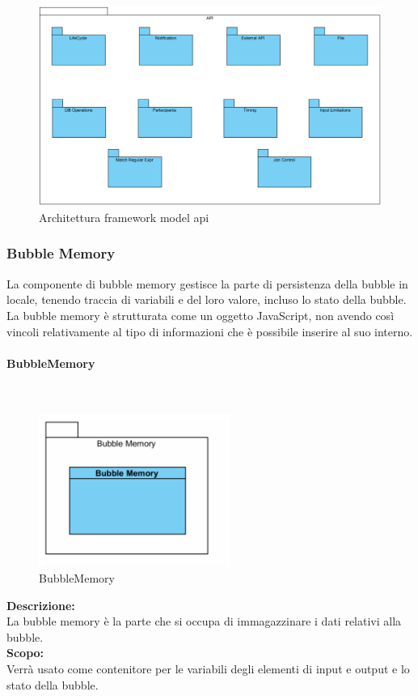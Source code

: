 \begin{figure}[H]
	\centering
	\includegraphics[width=14cm]{diagrammi_img/classi_e_package/framework_api_package.png}
	\caption{Architettura framework model api}
\end{figure}

\subsubsection{Bubble Memory}
La componente di bubble memory gestisce la parte di persistenza della bubble in locale, tenendo traccia di variabili e del loro valore, incluso lo stato della bubble. La bubble memory è strutturata come un oggetto JavaScript, non avendo così vincoli relativamente al tipo di informazioni che è possibile inserire al suo interno.
\begin{samepage}
	\paragraph{BubbleMemory}\label{fm-memory}\mbox{}\\
	\nopagebreak
	\begin{figure}[H]
		\centering
		\includegraphics[height=5cm]{diagrammi_img/classi_e_package/bubble_memory.png}
		\caption{BubbleMemory}
	\end{figure}	
\end{samepage}
\textbf{Descrizione:}\\
La bubble memory è la parte che si occupa di immagazzinare i dati relativi alla bubble. \\
\textbf{Scopo:}\\
Verrà usato come contenitore per le variabili degli elementi di input e output e lo stato della bubble.

